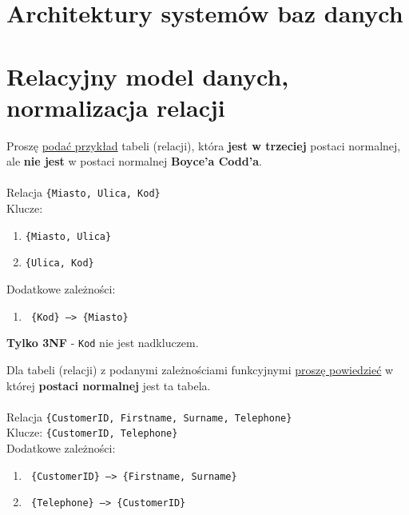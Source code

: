 \section{Architektury systemów baz danych}
\label{sec:architektury_systemow}

\section{Relacyjny model danych, normalizacja relacji}
\label{sec:relacyjny_model_danych_normalizacja_relacji}

\horrule{0.5pt}
Proszę \underline{podać przykład} tabeli (relacji), która \textbf{jest w
trzeciej} postaci normalnej, ale \textbf{nie jest} w postaci normalnej
\textbf{Boyce’a Codd’a}.\\
\horrule{0.5pt}\\

Relacja \texttt{\{Miasto, Ulica, Kod\}}\\
Klucze:
\begin{enumerate}
    \item \texttt{\{Miasto, Ulica\}}
    \item \texttt{\{Ulica, Kod\}}
\end{enumerate}

Dodatkowe zależności:
\begin{enumerate}
    \item \texttt{ \{Kod\} --> \{Miasto\}}\\
\end{enumerate}

\begin{tcolorbox}
    \textbf{Tylko 3NF} - \texttt{Kod} nie jest nadkluczem.
\end{tcolorbox}


\horrule{0.5pt}
Dla tabeli (relacji) z podanymi zależnościami funkcyjnymi \underline{proszę
powiedzieć} w której \textbf{postaci normalnej} jest ta tabela.\\
\horrule{0.5pt}\\

Relacja \texttt{\{CustomerID, Firstname, Surname, Telephone\}}\\
Klucze: \texttt{\{CustomerID, Telephone\}}\\
Dodatkowe zależności:
\begin{enumerate}
    \item \texttt{ \{CustomerID\} --> \{Firstname, Surname\}}
    \item \texttt{ \{Telephone\} --> \{CustomerID\}}
\end{enumerate}

